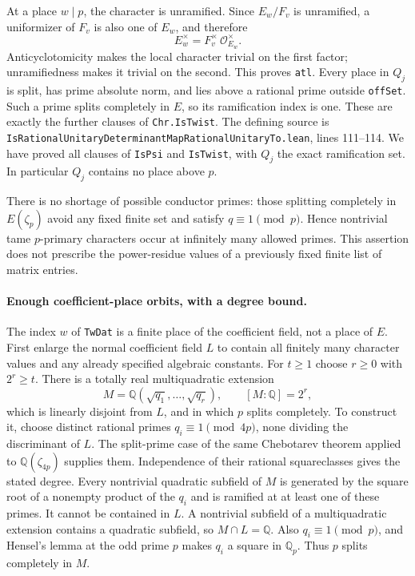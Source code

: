 \documentclass[11pt]{article}
\newcommand{\Q}{\mathbb Q}\newcommand{\C}{\mathbb C}\newcommand{\Z}{\mathbb Z}\newcommand{\R}{\mathbb R}\newcommand{\A}{\mathbb A}\newcommand{\OO}{\mathcal O}
\theoremstyle{definition}\newtheorem{definition}[theorem]{Definition}\newtheorem{remark}[theorem]{Remark}
\begin{document}
At a place $w\mid p$, the character is unramified.  Since
$E_w/F_v$ is unramified, a uniformizer of $F_v$ is also one of $E_w$,
and therefore
\[
 E_w^\times=F_v^\times\,\OO_{E_w}^\times.
 \tag{A14c}
\]
Anticyclotomicity makes the local character trivial on the first
factor; unramifiedness makes it trivial on the second.  This proves
\texttt{atl}.  Every place in $Q_j$ is split, has prime absolute norm,
and lies above a rational prime outside \texttt{offSet}.  Such a prime
splits completely in $E$, so its ramification index is one.  These are
exactly the further clauses of \texttt{Chr.IsTwist}.  The defining
source is
\nolinkurl{IsRationalUnitaryDeterminantMapRationalUnitaryTo.lean},
lines 111--114.  We have proved all clauses of
\texttt{IsPsi} and \texttt{IsTwist}, with $Q_j$ the exact ramification
set.  In particular $Q_j$ contains no place above $p$.

There is no shortage of possible conductor primes: those splitting
completely in $E(\zeta_p)$ avoid any fixed finite set and satisfy
$q\equiv1\pmod p$.  Hence nontrivial tame $p$-primary characters occur
at infinitely many allowed primes.  This assertion does not prescribe
the power-residue values of a previously fixed finite list of matrix
entries.

\paragraph{Enough coefficient-place orbits, with a degree bound.}
The index $w$ of \texttt{TwDat} is a finite place of the coefficient
field, not a place of $E$.  First enlarge the normal coefficient field
$L$ to contain all finitely many character values and any already
specified algebraic constants.  For $t\geq1$ choose $r\geq0$ with
$2^r\geq t$.  There is a totally real multiquadratic extension
\[
 M=\Q(\sqrt{q_1},\ldots,\sqrt{q_r}),
 \qquad [M:\Q]=2^r,
 \tag{A14d}
\]
which is linearly disjoint from $L$, and in which $p$ splits
completely.  To construct it, choose distinct rational primes
$q_i\equiv1\pmod{4p}$, none dividing the discriminant of $L$.
The split-prime case of the same Chebotarev theorem applied to
$\Q(\zeta_{4p})$ supplies them.  Independence of their rational
squareclasses gives the stated degree.  Every nontrivial quadratic
subfield of $M$ is generated by the square root of a nonempty product
of the $q_i$ and is ramified at at least one of these primes.
It cannot be contained in $L$.  A nontrivial subfield of a
multiquadratic extension contains a quadratic subfield, so
$M\cap L=\Q$.  Also $q_i\equiv1\pmod p$, and Hensel's lemma at the
odd prime $p$ makes $q_i$ a square in $\Q_p$.  Thus $p$ splits
completely in $M$.
\end{document}
